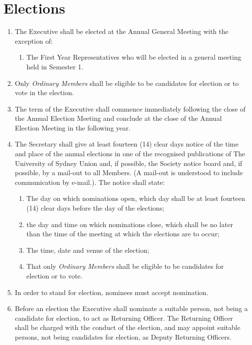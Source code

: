 \documentclass[11pt]{article}
\begin{document}
\section{Elections}
\begin{enumerate}[\thesection .1]
    \item The Executive shall be elected at the Annual General Meeting with the exception of:
    \begin{enumerate}[\hspace{5mm}1.]
        \item The First Year Representatives who will be elected in a general meeting held in Semester 1.
    \end{enumerate}
    \item Only \textit{Ordinary Members} shall be eligible to be candidates for election or to vote in the election.
    \item The term of the Executive shall commence immediately following the close of the Annual Election Meeting and conclude at the close of the Annual Election Meeting in the following year.
    \item The Secretary shall give at least fourteen (14) clear days notice of the time and place of the annual elections in one of the recognised publications of The University of Sydney Union and, if possible, the Society notice board and, if possible, by a mail-out to all Members. (A mail-out is understood to include communication by e-mail.).  The notice shall state:
    \begin{enumerate}[\hspace{5mm}1.]
        \item The day on which nominations open, which day shall be at least fourteen (14) clear days before the day of the elections;
        \item  the day and time on which nominations close, which shall be no later than the time of the meeting at which the elections are to occur;
        \item The time, date and venue of the election;
        \item That only \textit{Ordinary Members} shall be eligible to be candidates for election or to vote.
    \end{enumerate}
    \item In order to stand for election, nominees must accept nomination.
    \item Before an election the Executive shall nominate a suitable person, not being a candidate for election, to act as Returning Officer. The Returning Officer shall be charged with the conduct of the election, and may appoint suitable persons, not being candidates for election, as Deputy Returning Officers.

\end{enumerate}
\end{document}
